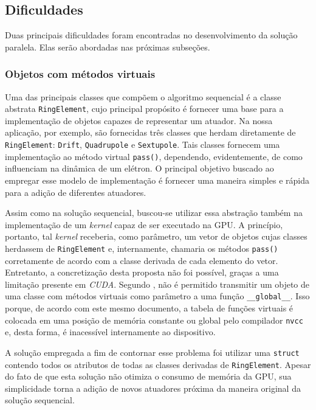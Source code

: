 \documentclass[12pt]{article}
\begin{document}
\subsection{Dificuldades}

Duas principais dificuldades foram encontradas no desenvolvimento da solução
paralela. Elas serão abordadas nas próximas subseções.

\subsubsection{Objetos com métodos virtuais}

Uma das principais classes que compõem o algoritmo sequencial é a classe
abstrata \texttt{RingElement}, cujo principal propósito é fornecer uma base para
a implementação de objetos capazes de representar um atuador. Na nossa
aplicação, por exemplo, são fornecidas três classes que herdam diretamente de
\texttt{RingElement}: \texttt{Drift}, \texttt{Quadrupole} e \texttt{Sextupole}.
Tais classes fornecem uma implementação ao método virtual \texttt{pass()},
dependendo, evidentemente, de como influenciam na dinâmica de um elétron. O
principal objetivo buscado ao empregar esse modelo de implementação é fornecer
uma maneira simples e rápida para a adição de diferentes atuadores.

Assim como na solução sequencial, buscou-se utilizar essa abstração também na
implementação de um \textit{kernel} capaz de ser executado na GPU. A princípio,
portanto, tal \textit{kernel} receberia, como parâmetro, um vetor de objetos
cujas classes herdassem de \texttt{RingElement} e, internamente, chamaria os
métodos \texttt{pass()} corretamente de acordo com a classe derivada de cada
elemento do vetor. Entretanto, a concretização desta proposta não foi possível, graças a uma
limitação presente em \textit{CUDA}. Segundo \cite{virtual}, não é permitido
transmitir um objeto de uma classe com métodos virtuais como parâmetro a uma
função \texttt{\_\_global\_\_}. Isso porque, de acordo com este mesmo documento,
a tabela de funções virtuais é colocada em uma posição de memória constante
ou global pelo compilador \texttt{nvcc} e, desta forma, é inacessível
internamente ao dispositivo.

A solução empregada a fim de contornar esse problema foi utilizar uma
\texttt{struct} contendo todos os atributos de todas as classes derivadas de
\texttt{RingElement}. Apesar do fato de que esta solução não otimiza o consumo
de memória da GPU, sua simplicidade torna a adição de novos atuadores próxima da
maneira original da solução sequencial.
\end{document}
